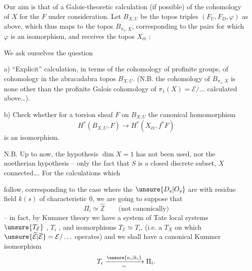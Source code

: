 Our aim is that of a Galois-theoretic calculation
(if possible) of the cohomology of $X$ for
the $F$ under consideration.
Let $B_{X,U}$ be the topos  triples
$(F_U,F_D,\varphi)$ as above, which thus maps
to the topos $B_{\pi_1,X}$, corresponding
to the pairs for which $\varphi$ is an isomorphism,
and receives the topos $X_{\mathrm{ét}}$ :

We ask ourselves the question

a) ``Explicit'' calculation, in terms of the cohomology
of profinite groups, of cohomology
in the abracadabra topos $B_{X,U}$. (N.B.
 the cohomology  of
$B_{\pi_1,X}$ is none other than the profinite
Galois cohomology of $\pi_1(X)=\mathcal E/\ldots$
calculated above\ldots).

b) Check whether for a torsion
sheaf $F$ on $B_{X,U}$ the canonical homomorphism
\[
H^{*}(B_{X,U},F)\longrightarrow
H^{*}(X_{\mathrm{ét}},f^{*}F)
\]
is an isomorphism.

N.B. Up to now, the hypothesis
$\dim X=1$ has not been used, nor the noetherian hypothesis
-- only the fact that $S$ is a closed discrete
subset, $X$ connected\ldots. For the calculations which

follow, corresponding to the  case where the
$\unsure{D_s|O_s}$ are  with residue field $k(s)$
of characteristic $0$, we are going to suppose that
\[
\Pi_i\simeq\widehat{\mathbb Z}\qquad\text{(not canonically)}
\]
-- in fact, by Kummer theory we
have a system of Tate local systems
$\unsure{T_{\mathcal E}}$ , $T_i$ , and isomorphisms $T_{\mathcal E}\simeq T_i$, 
(i.e. a $T_X$ on which $\unsure{\widetilde{\mathcal E}|\overline{\mathcal E}}=\mathcal E/\ldots$ operates)
and we shall have a canonical Kummer isomorphism
\[
T_i\xrightarrow[\sim]{\unsure{\kappa_i|k_i}}\Pi_i.
\]

